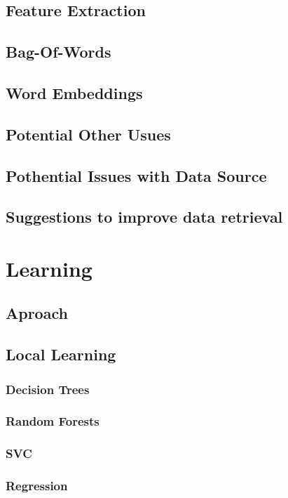 \documentclass[12pt]{report}
\begin{document}
        \section{Feature Extraction}
        \section{Bag-Of-Words}
        \section{Word Embeddings}
        \section{Potential Other Usues}
        \section{Pothential Issues with Data Source}
        \section{Suggestions to improve data retrieval}

\chapter{Learning}

\section{Aproach}

\section{Local Learning}
\subsection{Decision Trees}
\subsection{Random Forests}
\subsection{SVC}
\subsection{Regression}
\end{document}
